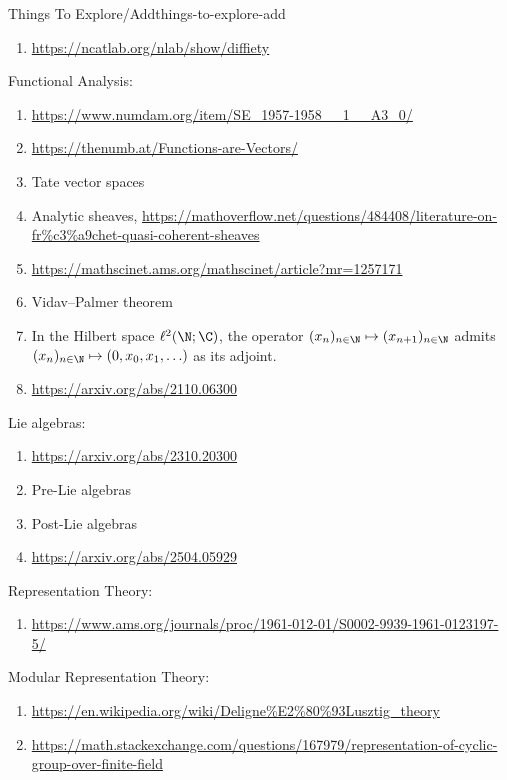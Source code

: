 \begin{remark}{Things To Explore/Add}{things-to-explore-add}
\begin{enumerate}
\begin{enumerate}
                    \begin{enumerate}
                        \item \url{https://ncatlab.org/nlab/show/diffiety}
                    \end{enumerate}
            \end{enumerate}
    \end{enumerate}
    Functional Analysis:
    \begin{enumerate}
        \item \url{https://www.numdam.org/item/SE_1957-1958__1__A3_0/}
        \item \url{https://thenumb.at/Functions-are-Vectors/}
        \item Tate vector spaces
        \item Analytic sheaves, \url{https://mathoverflow.net/questions/484408/literature-on-fr\%c3\%a9chet-quasi-coherent-sheaves}
        \item \url{https://mathscinet.ams.org/mathscinet/article?mr=1257171}
        \item Vidav--Palmer theorem
        \item In the Hilbert space $\ell^{2}(\N;\C)$, the operator $(x_{n})_{n\in\N}\mapsto(x_{n+1})_{n\in\N}$ admits $(x_{n})_{n\in\N}\mapsto(0,x_{0},x_{1},\ldots)$ as its adjoint.
        \item \url{https://arxiv.org/abs/2110.06300}
    \end{enumerate}
    Lie algebras:
    \begin{enumerate}
        \item \url{https://arxiv.org/abs/2310.20300}
        \item Pre-Lie algebras
        \item Post-Lie algebras
        \item \url{https://arxiv.org/abs/2504.05929}
    \end{enumerate}
    Representation Theory:
    \begin{enumerate}
        \item \url{https://www.ams.org/journals/proc/1961-012-01/S0002-9939-1961-0123197-5/}
    \end{enumerate}
    Modular Representation Theory:
    \begin{enumerate}
        \item \url{https://en.wikipedia.org/wiki/Deligne\%E2\%80\%93Lusztig\_theory}
        \item \url{https://math.stackexchange.com/questions/167979/representation-of-cyclic-group-over-finite-field}

\end{enumerate}
\end{remark}
